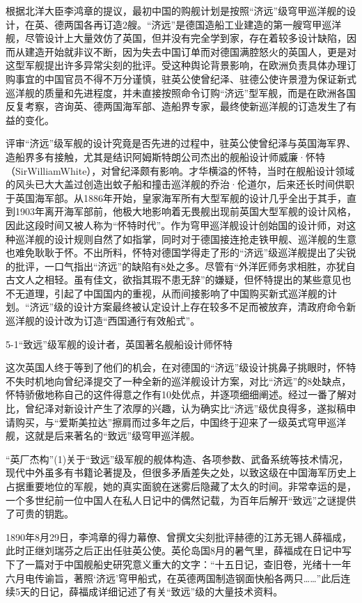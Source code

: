 \documentclass[12pt,UTF8]{ctexbook}
\begin{document}
根据北洋大臣李鸿章的提议，最初中国的购舰计划是按照“济远”级穹甲巡洋舰的设计，在英、德两国各再订造2艘。“济远”是德国造船工业建造的第一艘穹甲巡洋舰，尽管设计上大量效仿了英国，但并没有完全学到家，存在着较多设计缺陷，因而从建造开始就非议不断，因为失去中国订单而对德国满腔怒火的英国人，更是对这型军舰提出许多异常尖刻的批评。受这种舆论背景影响，在欧洲负责具体办理订购事宜的中国官员不得不万分谨慎，驻英公使曾纪泽、驻德公使许景澄为保证新式巡洋舰的质量和先进程度，并未直接按照命令订购“济远”型军舰，而是在欧洲各国反复考察，咨询英、德两国海军部、造船界专家，最终使新巡洋舰的订造发生了有益的变化。

评审“济远”级军舰的设计究竟是否先进的过程中，驻英公使曾纪泽与英国海军界、造船界多有接触，尤其是结识阿姆斯特朗公司杰出的舰船设计师威廉·怀特（SirWilliamWhite），对曾纪泽颇有影响。才华横溢的怀特，当时在舰船设计领域的风头已大大盖过创造出蚊子船和撞击巡洋舰的乔治·伦道尔，后来还长时间供职于英国海军部。从1886年开始，皇家海军所有大型军舰的设计几乎全出于其手，直到1903年离开海军部前，他极大地影响着无畏舰出现前英国大型军舰的设计风格，因此这段时间又被人称为“怀特时代”。作为穹甲巡洋舰设计创始国的设计师，对这种巡洋舰的设计规则自然了如指掌，同时对于德国接连抢走铁甲舰、巡洋舰的生意也难免耿耿于怀。不出所料，怀特对德国学得走了形的“济远”级巡洋舰提出了尖锐的批评，一口气指出“济远”的缺陷有8处之多。尽管有“外洋匠师务求相胜，亦犹自古文人之相轻。虽有佳文，欲指其瑕不患无辞”的嫌疑，但怀特提出的某些意见也不无道理，引起了中国国内的重视，从而间接影响了中国购买新式巡洋舰的计划。“济远”级的设计方案最终被认定设计上存在较多不足而被放弃，清政府命令新巡洋舰的设计改为订造“西国通行有效船式”。

5-1“致远”级军舰的设计者，英国著名舰船设计师怀特

这次英国人终于等到了他们的机会，在对德国的“济远”级设计挑鼻子挑眼时，怀特不失时机地向曾纪泽提交了一种全新的巡洋舰设计方案，对比“济远”的8处缺点，怀特骄傲地称自己的这件得意之作有10处优点，并逐项细细阐述。经过一番了解对比，曾纪泽对新设计产生了浓厚的兴趣，认为确实比“济远”级优良得多，遂拟稿申请购买，与“爱斯美拉达”擦肩而过多年之后，中国终于迎来了一级英式穹甲巡洋舰，这就是后来著名的“致远”级穹甲巡洋舰。

“英厂杰构”(1)关于“致远”级军舰的舰体构造、各项参数、武备系统等技术情况，现代中外虽多有书籍论著提及，但很多矛盾差失之处，以致这级在中国海军历史上占据重要地位的军舰，她的真实面貌在迷雾后隐藏了太久的时间。非常幸运的是，一个多世纪前一位中国人在私人日记中的偶然记载，为百年后解开“致远”之谜提供了可贵的钥匙。

1890年8月29日，李鸿章的得力幕僚、曾撰文尖刻批评赫德的江苏无锡人薛福成，此时正继刘瑞芬之后正出任驻英公使。英伦岛国8月的暑气里，薛福成在日记中写下了一篇对于中国舰船史研究意义重大的文字：“十五日记，查旧卷，光绪十一年六月电传谕旨，著照‘济远’穹甲船式，在英德两国制造钢面快船各两只……”此后连续5天的日记，薛福成详细记述了有关“致远”级的大量技术资料。
\end{document}
